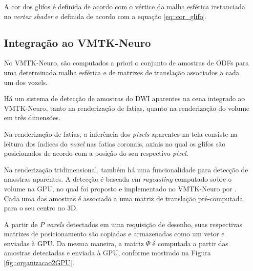 \documentclass[
    12pt,                %
    oneside,            %
    a4paper,            %
    english,            %
    french,                %
    spanish,            %
    brazil                %
    ]{abntex2}
\begin{document}
A cor dos glifos é definida de acordo com o vértice da malha esférica instanciada no \textit{vertex shader} e definida de acordo com a equação \ref{eq::cor_glifo}.






\subsection{Integração ao VMTK-Neuro}

No VMTK-Neuro, são computados a priori o conjunto de amostras de ODFs para uma determinada malha esférica e de matrizes de translação associados a cada um dos voxels.

Há um sistema de detecção de amostras do DWI aparentes na cena integrado ao VMTK-Neuro, tanto na renderização de fatias, quanto na renderização do volume em três dimensões.

Na renderização de fatias, a inferência dos \textit{pixels} aparentes na tela consiste na leitura dos índices do \textit{voxel} nas fatias coronais, axiais no qual os glifos são posicionados de acordo com a posição do seu respectivo \textit{pixel}.

Na renderização tridimensional, também há uma funcionalidade para detecção de amostras aparentes. A detecção é baseada em \textit{raycasting} computado sobre o volume na GPU, no qual foi proposto e implementado no VMTK-Neuro por . Cada uma das amostras é associado a uma matriz de translação pré-computada para o seu centro no 3D.

A partir de $P$ \textit{voxels} detectados em uma requisição de desenho, suas respectivas matrizes de posicionamento são copiadas e armazenadas como um vetor e enviadas à GPU. Da mesma maneira, a matriz $\Psi$ é computada a partir das amostras detectadas e enviada à GPU, conforme mostrado na Figura \ref{fig::organizacao2GPU}.
\end{document}
